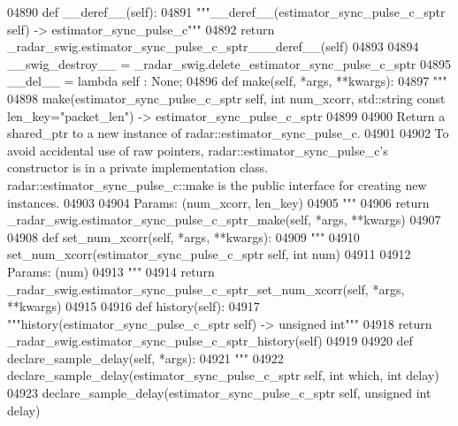 \begin{DoxyCode}
{{{{{{{{{{{{{{{{{04890     \textcolor{keyword}{def }__deref__(self):
04891         \textcolor{stringliteral}{"""\_\_deref\_\_(estimator\_sync\_pulse\_c\_sptr self) -> estimator\_sync\_pulse\_c"""}
04892         \textcolor{keywordflow}{return} \_radar\_swig.estimator\_sync\_pulse\_c\_sptr\_\_\_deref\_\_(self)
04893 
04894     \_\_swig\_destroy\_\_ = \_radar\_swig.delete\_estimator\_sync\_pulse\_c\_sptr
04895     \_\_del\_\_ = \textcolor{keyword}{lambda} self : \textcolor{keywordtype}{None};
04896     \textcolor{keyword}{def }make(self, *args, **kwargs):
04897         \textcolor{stringliteral}{"""}
04898 \textcolor{stringliteral}{        make(estimator\_sync\_pulse\_c\_sptr self, int num\_xcorr, std::string const len\_key="packet\_len") ->
       estimator\_sync\_pulse\_c\_sptr}
04899 \textcolor{stringliteral}{}
04900 \textcolor{stringliteral}{        Return a shared\_ptr to a new instance of radar::estimator\_sync\_pulse\_c.}
04901 \textcolor{stringliteral}{}
04902 \textcolor{stringliteral}{        To avoid accidental use of raw pointers, radar::estimator\_sync\_pulse\_c's constructor is in a
       private implementation class. radar::estimator\_sync\_pulse\_c::make is the public interface for creating new
       instances.}
04903 \textcolor{stringliteral}{}
04904 \textcolor{stringliteral}{        Params: (num\_xcorr, len\_key)}
04905 \textcolor{stringliteral}{        """}
04906         \textcolor{keywordflow}{return} \_radar\_swig.estimator\_sync\_pulse\_c\_sptr\_make(self, *args, **kwargs)
04907 
04908     \textcolor{keyword}{def }set_num_xcorr(self, *args, **kwargs):
04909         \textcolor{stringliteral}{"""}
04910 \textcolor{stringliteral}{        set\_num\_xcorr(estimator\_sync\_pulse\_c\_sptr self, int num)}
04911 \textcolor{stringliteral}{}
04912 \textcolor{stringliteral}{        Params: (num)}
04913 \textcolor{stringliteral}{        """}
04914         \textcolor{keywordflow}{return} \_radar\_swig.estimator\_sync\_pulse\_c\_sptr\_set\_num\_xcorr(self, *args, **kwargs)
04915 
04916     \textcolor{keyword}{def }history(self):
04917         \textcolor{stringliteral}{"""history(estimator\_sync\_pulse\_c\_sptr self) -> unsigned int"""}
04918         \textcolor{keywordflow}{return} \_radar\_swig.estimator\_sync\_pulse\_c\_sptr\_history(self)
04919 
04920     \textcolor{keyword}{def }declare_sample_delay(self, *args):
04921         \textcolor{stringliteral}{"""}
04922 \textcolor{stringliteral}{        declare\_sample\_delay(estimator\_sync\_pulse\_c\_sptr self, int which, int delay)}
04923 \textcolor{stringliteral}{        declare\_sample\_delay(estimator\_sync\_pulse\_c\_sptr self, unsigned int delay)}
}}}}}}}}}}}}}}}}}
\end{DoxyCode}
